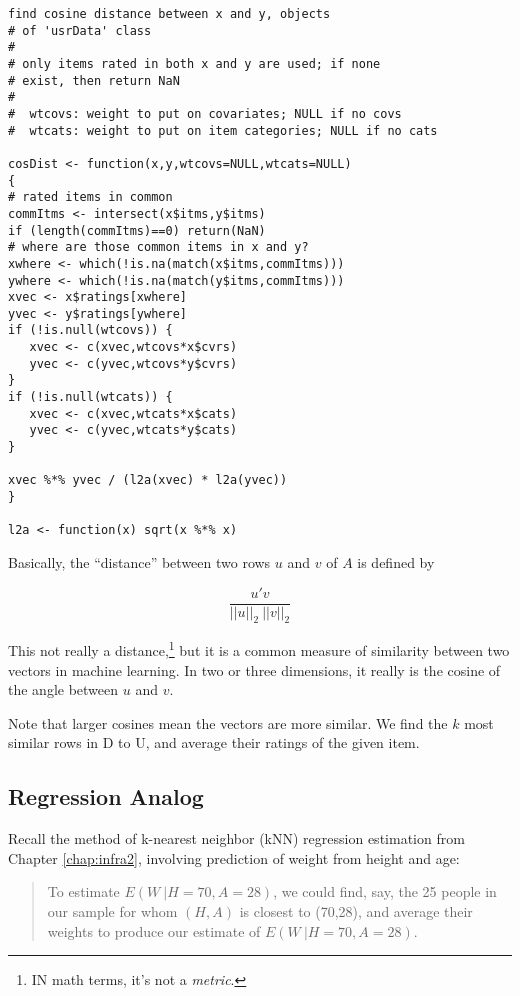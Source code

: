 \begin{lstlisting}
find cosine distance between x and y, objects 
# of 'usrData' class 
# 
# only items rated in both x and y are used; if none 
# exist, then return NaN 
# 
#  wtcovs: weight to put on covariates; NULL if no covs 
#  wtcats: weight to put on item categories; NULL if no cats 

cosDist <- function(x,y,wtcovs=NULL,wtcats=NULL) 
{ 
# rated items in common 
commItms <- intersect(x$itms,y$itms) 
if (length(commItms)==0) return(NaN) 
# where are those common items in x and y? 
xwhere <- which(!is.na(match(x$itms,commItms))) 
ywhere <- which(!is.na(match(y$itms,commItms))) 
xvec <- x$ratings[xwhere] 
yvec <- y$ratings[ywhere] 
if (!is.null(wtcovs)) { 
   xvec <- c(xvec,wtcovs*x$cvrs) 
   yvec <- c(yvec,wtcovs*y$cvrs) 
} 
if (!is.null(wtcats)) { 
   xvec <- c(xvec,wtcats*x$cats) 
   yvec <- c(yvec,wtcats*y$cats) 
} 

xvec %*% yvec / (l2a(xvec) * l2a(yvec)) 
}

l2a <- function(x) sqrt(x %*% x) 
\end{lstlisting}

Basically, the ``distance'' between two rows $u$ and $v$
of $A$ is defined by

\begin{equation}
\frac{u'v}{||u||_2 ~ ||v||_2}
\end{equation}

This not really a distance,\footnote{IN math terms, it's not a
\textit{metric}.} but it is a common measure of similarity between two
vectors in machine learning.  In two or three dimensions, it really is
the cosine of the angle between $u$ and $v$.  

Note that larger cosines mean the vectors are more similar.  We find the
$k$ most similar rows in D to U, and average their ratings of the given
item.

\subsection{Regression Analog}

Recall the method of k-nearest neighbor (kNN) regression estimation from
Chapter \ref{chap:infra2}, involving prediction of weight from height
and age:

\begin{quote}
To estimate $E(W ~| H=70, A=28)$, we could find, say, the 25 people in our
sample for whom $(H,A)$ is closest to (70,28), and average their weights
to produce our estimate of $E(W ~| H=70, A=28)$.
\end{quote}

